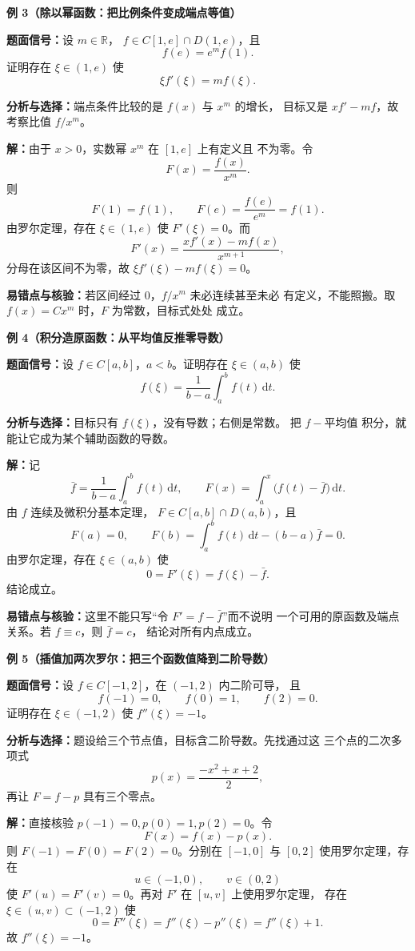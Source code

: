 \begin{knowledgeBox}
\textbf{例 3（除以幂函数：把比例条件变成端点等值）}

\textbf{题面信号：}设 \(m\in\mathbb R\)，
\(f\in C[1,e]\cap D(1,e)\)，且
\[
f(e)=e^m f(1).
\]
证明存在 \(\xi\in(1,e)\) 使
\[
\xi f'(\xi)=m f(\xi).
\]

\textbf{分析与选择：}端点条件比较的是 \(f(x)\) 与 \(x^m\) 的增长，
目标又是 \(xf'-mf\)，故考察比值 \(f/x^m\)。

\textbf{解：}由于 \(x>0\)，实数幂 \(x^m\) 在 \([1,e]\) 上有定义且
不为零。令
\[
F(x)=\frac{f(x)}{x^m}.
\]
则
\[
F(1)=f(1),\qquad F(e)=\frac{f(e)}{e^m}=f(1).
\]
由罗尔定理，存在 \(\xi\in(1,e)\) 使 \(F'(\xi)=0\)。而
\[
F'(x)=\frac{xf'(x)-mf(x)}{x^{m+1}},
\]
分母在该区间不为零，故 \(\xi f'(\xi)-mf(\xi)=0\)。

\textbf{易错点与核验：}若区间经过 \(0\)，\(f/x^m\) 未必连续甚至未必
有定义，不能照搬。取 \(f(x)=Cx^m\) 时，\(F\) 为常数，目标式处处
成立。

\textbf{例 4（积分造原函数：从平均值反推零导数）}

\textbf{题面信号：}设 \(f\in C[a,b]\)，\(a<b\)。证明存在
\(\xi\in(a,b)\) 使
\[
f(\xi)=\frac{1}{b-a}\int_a^b f(t)\,\mathrm dt.
\]

\textbf{分析与选择：}目标只有 \(f(\xi)\)，没有导数；右侧是常数。
把 \(f-\text{平均值}\) 积分，就能让它成为某个辅助函数的导数。

\textbf{解：}记
\[
\bar f=\frac{1}{b-a}\int_a^b f(t)\,\mathrm dt,\qquad
F(x)=\int_a^x\bigl(f(t)-\bar f\bigr)\,\mathrm dt.
\]
由 \(f\) 连续及微积分基本定理，
\(F\in C[a,b]\cap D(a,b)\)，且
\[
F(a)=0,\qquad
F(b)=\int_a^b f(t)\,\mathrm dt-(b-a)\bar f=0.
\]
由罗尔定理，存在 \(\xi\in(a,b)\) 使
\[
0=F'(\xi)=f(\xi)-\bar f.
\]
结论成立。

\textbf{易错点与核验：}这里不能只写“令 \(F'=f-\bar f\)”而不说明
一个可用的原函数及端点关系。若 \(f\equiv c\)，则 \(\bar f=c\)，
结论对所有内点成立。

\textbf{例 5（插值加两次罗尔：把三个函数值降到二阶导数）}

\textbf{题面信号：}设 \(f\in C[-1,2]\)，在 \((-1,2)\) 内二阶可导，
且
\[
f(-1)=0,\qquad f(0)=1,\qquad f(2)=0.
\]
证明存在 \(\xi\in(-1,2)\) 使 \(f''(\xi)=-1\)。

\textbf{分析与选择：}题设给三个节点值，目标含二阶导数。先找通过这
三个点的二次多项式
\[
p(x)=\frac{-x^2+x+2}{2},
\]
再让 \(F=f-p\) 具有三个零点。

\textbf{解：}直接核验 \(p(-1)=0,p(0)=1,p(2)=0\)。令
\[
F(x)=f(x)-p(x).
\]
则 \(F(-1)=F(0)=F(2)=0\)。分别在 \([-1,0]\) 与 \([0,2]\)
使用罗尔定理，存在
\[
u\in(-1,0),\qquad v\in(0,2)
\]
使 \(F'(u)=F'(v)=0\)。再对 \(F'\) 在 \([u,v]\) 上使用罗尔定理，
存在 \(\xi\in(u,v)\subset(-1,2)\) 使
\[
0=F''(\xi)=f''(\xi)-p''(\xi)=f''(\xi)+1.
\]
故 \(f''(\xi)=-1\)。


\end{knowledgeBox}
